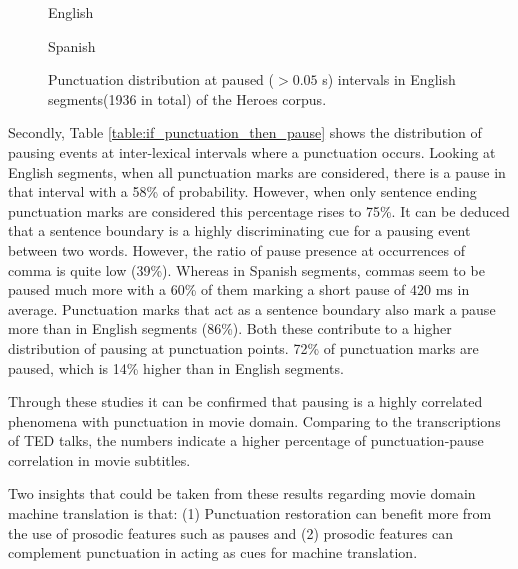 \begin{figure}[h]
\begin{minipage}{0.5\textwidth}
    \end{minipage}
    \begin{minipage}{.5\textwidth}
        \centering
        English
    \end{minipage}%
    \begin{minipage}{0.5\textwidth}
        \centering
        Spanish
    \end{minipage}
\caption{Punctuation distribution at paused ($ > 0.05$ s) intervals in English segments(1936 in total) of the Heroes corpus.}
\label{figure:if_pause_then_punctuation}
\end{figure}

Secondly, Table \ref{table:if_punctuation_then_pause} shows the distribution of pausing events at inter-lexical intervals where a punctuation occurs. Looking at English segments, when all punctuation marks are considered, there is a pause in that interval with a 58\% of probability. However, when only sentence ending punctuation marks are considered this percentage rises to 75\%. It can be deduced that a sentence boundary is a highly discriminating cue for a pausing event between two words. However, the ratio of pause presence at occurrences of comma is quite low (39\%). Whereas in Spanish segments, commas seem to be paused much more with a 60\% of them marking a short pause of 420 ms in average. Punctuation marks that act as a sentence boundary also mark a pause more than in English segments (86\%). Both these contribute to a higher distribution of pausing at punctuation points. 72\% of punctuation marks are paused, which is 14\% higher than in English segments. 

Through these studies it can be confirmed that pausing is a highly correlated phenomena with punctuation in movie domain. Comparing to the transcriptions of TED talks, the numbers indicate a higher percentage of punctuation-pause correlation in movie subtitles. 

Two insights that could be taken from these results regarding movie domain machine translation is that: (1) Punctuation restoration can benefit more from the use of prosodic features such as pauses and (2) prosodic features can complement punctuation in acting as cues for machine translation. 

